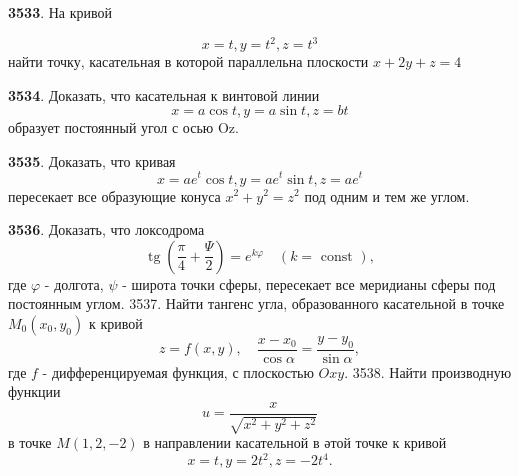 \documentclass{article}
\begin{document}
\textbf{3533}. На кривой

$$
x=t, y=t^2, z=t^3
$$
найти точку, касательная в которой параллельна плоскости $x+2 y+z=4$

\textbf{3534}. Доказать, что касательная к винтовой линии
$$
x=a \cos t, y=a \sin t, z=b t
$$
образует постоянный угол с осью $\mathrm{Oz}$.

\textbf{3535}. Доказать, что кривая
$$
x=a e^t \cos t, y=a e^t \sin t, z=a e^t
$$
пересекает все образующие конуса $x^2+y^2=z^2$ под одним и тем же углом.

\textbf{3536}. Доказать, что локсодрома
$$
\operatorname{tg}\left(\frac{\pi}{4}+\frac{\Psi}{2}\right)=e^{k \varphi} \quad(k=\text { const }),
$$
где $\varphi$ - долгота, $\psi$ - широта точки сферы, пересекает все меридианы сферы под постоянным углом.
3537. Найти тангенс угла, образованного касательной в точке $M_0\left(x_0, y_0\right)$ к кривой
$$
z=f(x, y), \quad \frac{x-x_0}{\cos \alpha}=\frac{y-y_0}{\sin \alpha},
$$
где $f$ - дифференцируемая функция, с плоскостью $O x y$.
3538. Найти производную функции
$$
u=\frac{x}{\sqrt{x^2+y^2+z^2}}
$$
в точке $M(1,2,-2)$ в направлении касательной в әтой точке к кривой
$$
x=t, y=2 t^2, z=-2 t^4 .
$$
\end{document}
